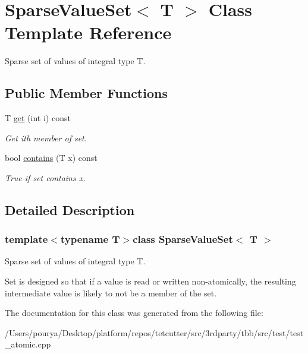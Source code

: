 \hypertarget{classSparseValueSet}{}\section{Sparse\+Value\+Set$<$ T $>$ Class Template Reference}
\label{classSparseValueSet}


Sparse set of values of integral type T.  


\subsection*{Public Member Functions}
\begin{DoxyCompactItemize}
\item 
\hypertarget{classSparseValueSet_a404ace6179f68569ab91a832dc305c96}{}T \hyperlink{classSparseValueSet_a404ace6179f68569ab91a832dc305c96}{get} (int i) const \label{classSparseValueSet_a404ace6179f68569ab91a832dc305c96}

\begin{DoxyCompactList}\small\item\em Get ith member of set. \end{DoxyCompactList}\item 
\hypertarget{classSparseValueSet_ab6bea315fbae9322b8d7b9a4365ff5ea}{}bool \hyperlink{classSparseValueSet_ab6bea315fbae9322b8d7b9a4365ff5ea}{contains} (T x) const \label{classSparseValueSet_ab6bea315fbae9322b8d7b9a4365ff5ea}

\begin{DoxyCompactList}\small\item\em True if set contains x. \end{DoxyCompactList}\end{DoxyCompactItemize}


\subsection{Detailed Description}
\subsubsection*{template$<$typename T$>$class Sparse\+Value\+Set$<$ T $>$}

Sparse set of values of integral type T. 

Set is designed so that if a value is read or written non-\/atomically, the resulting intermediate value is likely to not be a member of the set. 

The documentation for this class was generated from the following file\+:\begin{DoxyCompactItemize}
\item 
/\+Users/pourya/\+Desktop/platform/repos/tetcutter/src/3rdparty/tbb/src/test/test\+\_\+atomic.\+cpp\end{DoxyCompactItemize}
